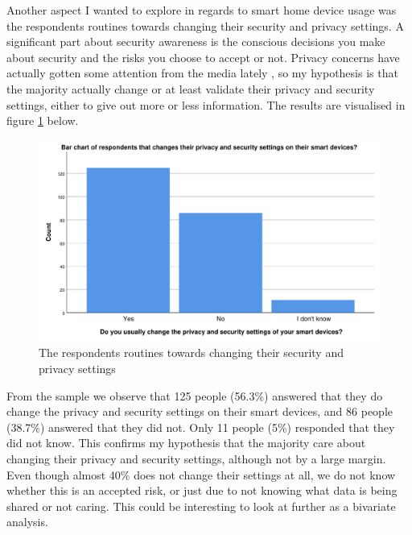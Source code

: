 Another aspect I wanted to explore in regards to smart home device usage was the respondents routines towards changing their security and privacy settings. A significant part about security awareness is the conscious decisions you make about security and the risks you choose to accept or not. Privacy concerns have actually gotten some attention from the media lately \cite{nrk_smarthoytaler} \cite{nrk_avslort}, so my hypothesis is that the majority actually change or at least validate their privacy and security settings, either to give out more or less information. The results are visualised in figure \ref{fig:settings} below. 
\begin{figure}[!h]
    \centering
    \includegraphics[scale=0.55]{figures/diagrams/settings.pdf}
    \caption{The respondents routines towards changing their security and privacy settings}
    \label{fig:settings}
\end{figure}
From the sample we observe that 125 people (56.3\%) answered that they do change the privacy and security settings on their smart devices, and 86 people (38.7\%) answered that they did not. Only 11 people (5\%) responded that they did not know. This confirms my hypothesis that the majority care about changing their privacy and security settings, although not by a large margin. Even though almost 40\% does not change their settings at all, we do not know whether this is an accepted risk, or just due to not knowing what data is being shared or not caring. This could be interesting to look at further as a bivariate analysis.

